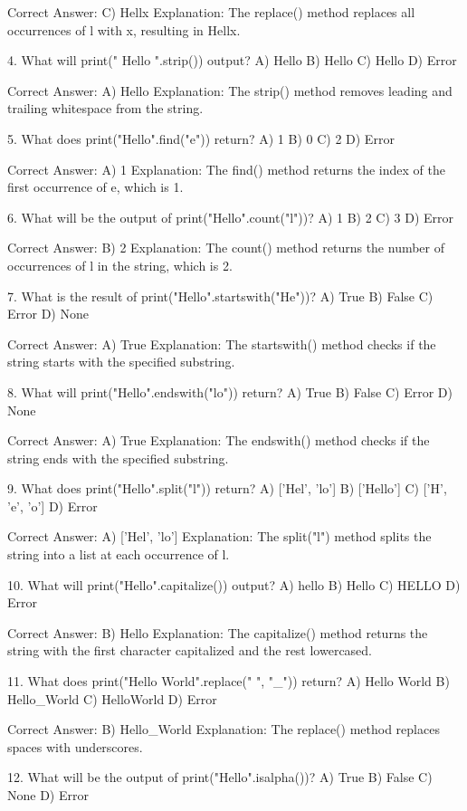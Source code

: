 Correct Answer: C) Hellx
Explanation: The replace() method replaces all occurrences of l with x, resulting in Hellx.

4. What will print(" Hello ".strip()) output?
A) Hello
B) Hello
C) Hello
D) Error

Correct Answer: A) Hello
Explanation: The strip() method removes leading and trailing whitespace from the string.

5. What does print("Hello".find("e")) return?
A) 1
B) 0
C) 2
D) Error

Correct Answer: A) 1
Explanation: The find() method returns the index of the first occurrence of e, which is 1.

6. What will be the output of print("Hello".count("l"))?
A) 1
B) 2
C) 3
D) Error

Correct Answer: B) 2
Explanation: The count() method returns the number of occurrences of l in the string, which is 2.

7. What is the result of print("Hello".startswith("He"))?
A) True
B) False
C) Error
D) None

Correct Answer: A) True
Explanation: The startswith() method checks if the string starts with the specified substring.

8. What will print("Hello".endswith("lo")) return?
A) True
B) False
C) Error
D) None

Correct Answer: A) True
Explanation: The endswith() method checks if the string ends with the specified substring.

9. What does print("Hello".split("l")) return?
A) ['Hel', 'lo']
B) ['Hello']
C) ['H', 'e', 'o']
D) Error

Correct Answer: A) ['Hel', 'lo']
Explanation: The split("l") method splits the string into a list at each occurrence of l.

10. What will print("Hello".capitalize()) output?
A) hello
B) Hello
C) HELLO
D) Error

Correct Answer: B) Hello
Explanation: The capitalize() method returns the string with the first character capitalized and the rest lowercased.

11. What does print("Hello World".replace(" ", "_")) return?
A) Hello World
B) Hello_World
C) HelloWorld
D) Error

Correct Answer: B) Hello_World
Explanation: The replace() method replaces spaces with underscores.

12. What will be the output of print("Hello".isalpha())?
A) True
B) False
C) None
D) Error

